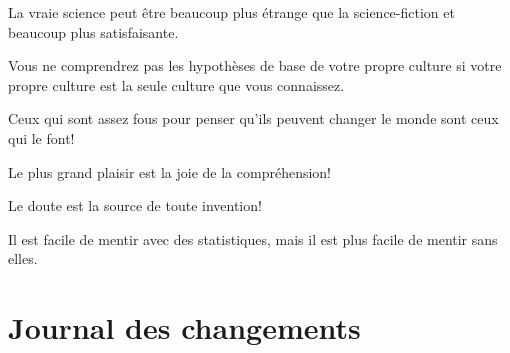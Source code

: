 \documentclass[12pt,a4paper,twoside,openright]{report}
\theoremstyle{definition}
\theoremstyle{itexmp}
\numberwithin{equation}{section}
\begin{document}
 	\begin{fquote}La vraie science peut être beaucoup plus étrange que la science-fiction et beaucoup plus satisfaisante.
 	\end{fquote}
 	
 	\begin{fquote}Vous ne comprendrez pas les hypothèses de base de votre propre culture si votre propre culture est la seule culture que vous connaissez.
 	\end{fquote}
 	
 	\begin{fquote}Ceux qui sont assez fous pour penser qu'ils peuvent changer le monde sont ceux qui le font!
 	\end{fquote}
 	
 	\begin{fquote}Le plus grand plaisir est la joie de la compréhension!
 	\end{fquote}
 	
 	\begin{fquote}Le doute est la source de toute invention!
 	\end{fquote}
 	
 	\begin{fquote}Il est facile de mentir avec des statistiques, mais il est plus facile de mentir sans elles.
 	\end{fquote}

\chapter{Journal des changements}
\end{document}
